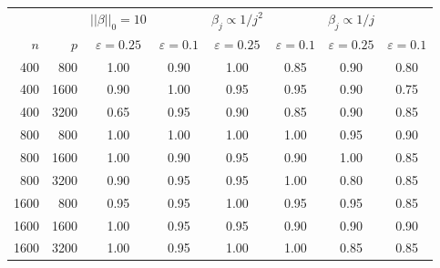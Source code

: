 \begin{table}[ht]
\centering
\begin{tabular}{|rr|cc|cc|cc|}
   \hline
 &  & $||\beta||_0 = 10$ &  & $\beta_j \propto 1/j^2$ &  & $\beta_j \propto 1/j$ &  \\ 
  $n$ & $p$ & $\varepsilon = 0.25$ & $\varepsilon = 0.1$ & $\varepsilon = 0.25$ & $\varepsilon = 0.1$ & $\varepsilon = 0.25$ & $\varepsilon = 0.1$ \\ 
   \hline
400 & 800 & 1.00 & 0.90 & 1.00 & 0.85 & 0.90 & 0.80 \\ 
  400 & 1600 & 0.90 & 1.00 & 0.95 & 0.95 & 0.90 & 0.75 \\ 
  400 & 3200 & 0.65 & 0.95 & 0.90 & 0.85 & 0.90 & 0.85 \\ 
   \hline
800 & 800 & 1.00 & 1.00 & 1.00 & 1.00 & 0.95 & 0.90 \\ 
  800 & 1600 & 1.00 & 0.90 & 0.95 & 0.90 & 1.00 & 0.85 \\ 
  800 & 3200 & 0.90 & 0.95 & 0.95 & 1.00 & 0.80 & 0.85 \\ 
   \hline
1600 & 800 & 0.95 & 0.95 & 1.00 & 0.95 & 0.95 & 0.85 \\ 
  1600 & 1600 & 1.00 & 0.95 & 0.95 & 0.90 & 0.90 & 0.90 \\ 
  1600 & 3200 & 1.00 & 0.95 & 1.00 & 1.00 & 0.85 & 0.85 \\ 
   \hline
\end{tabular}
\end{table}
